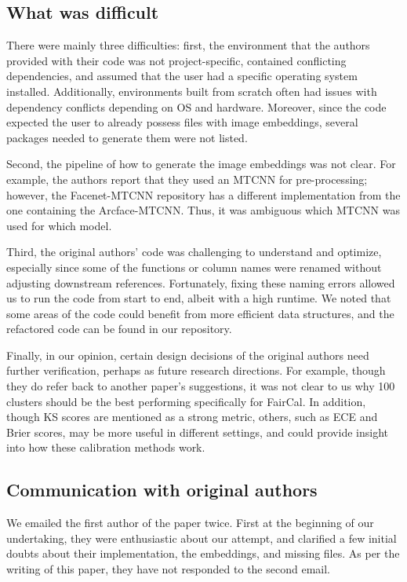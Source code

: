 \subsection{What was difficult}
There were mainly three difficulties: first, the environment that the authors provided with their code was not project-specific, contained conflicting dependencies, and assumed that the user had a specific operating system installed. Additionally, environments built from scratch often had issues with dependency conflicts depending on OS and hardware. Moreover, since the code expected the user to already possess files with image embeddings, several packages needed to generate them were not listed.

Second, the pipeline of how to generate the image embeddings was not clear. For example, the authors report that they used an MTCNN for pre-processing; however, the Facenet-MTCNN repository has a different implementation from the one containing the Arcface-MTCNN. Thus, it was ambiguous which MTCNN was used for which model. 

Third, the original authors' code was challenging to understand and optimize, especially since some of the functions or column names were renamed without adjusting downstream references. Fortunately, fixing these naming errors allowed us to run the code from start to end, albeit with a high runtime. We noted that some areas of the code could benefit from more efficient data structures, and the refactored code can be found in our repository.

Finally, in our opinion, certain design decisions of the original authors need further verification, perhaps as future research directions. For example, though they do refer back to another paper's suggestions, it was not clear to us why 100 clusters should be the best performing specifically for FairCal. In addition, though KS scores are mentioned as a strong metric, others, such as ECE and Brier scores, may be more useful in different settings, and could provide insight into how these calibration methods work.

\subsection{Communication with original authors}
We emailed the first author of the paper twice. First at the beginning of our undertaking, they were enthusiastic about our attempt, and clarified a few initial doubts about their implementation, the embeddings, and missing files. As per the writing of this paper, they have not responded to the second email.
